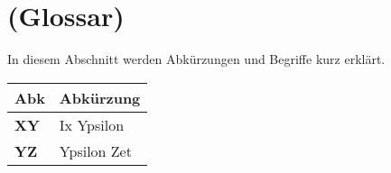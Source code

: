 %
%

\chapter*{(Glossar)}\label{chap.glossar}
\label{cha:abkürzungsverzeichnis}

In diesem Abschnitt werden Abkürzungen und Begriffe kurz erklärt.

\begin{longtable}{|m{3cm}|m{11cm}|}\hline	
	\rowcolor{gray} \textbf{Abk}&
	Abkürzung \\ \hline	

	\textbf{XY}&
	Ix Ypsilon \\ \hline	
	
	\textbf{YZ}&
	Ypsilon Zet \\ \hline
	
	
	
	
	
\end{longtable}

